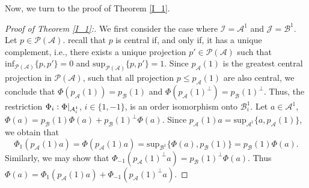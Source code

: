 \documentclass[12pt]{amsart}
\theoremstyle{definition}
\theoremstyle{remark}
\numberwithin{equation}{section}
\begin{document}
Now, we turn to the proof of Theorem \ref{I_1}.
\begin{proof}[Proof of Theorem \ref{I_1}:]
	We first consider  the case where $\mathcal{I}=\mathcal{A}^1$ and 	$\mathcal{J}=\mathcal{B}^1$.  Let  $p\in\mathcal{P(A)}$.   recall that  $p$ is central if, and only if, it has a unique complement, i.e., there exists a unique projection  $p'\in\mathcal{P(A)}$ such that $\mathrm{inf}_{\mathcal{P(A)}}\{p,p'\}=0$ and $\mathrm{sup}_{\mathcal{P(A)}}\{p,p'\}=1$. Since $p_{\mathcal{A}}(1)$ is the greatest central  projection in  $\mathcal{P(A)}$, such that all projection $p\leq p_{\mathcal{A}}(1)$ are  also central, we conclude that  $\Phi\left( p_\mathcal{A} (1)\right) =p_\mathcal{B} (1)$ and $\Phi\left( p_\mathcal{A} (1)^\perp\right)= p_\mathcal{B} (1)^\perp$. Thus, the restriction $\Phi_i:\Phi\arrowvert_{\mathcal{A}_i^1}$,  $i\in\{1,-1\}$,   is an order isomorphism onto   $\mathcal{B}_i^1$. Let $a\in\mathcal{A}^1$, $\Phi(a)=p_\mathcal{B} (1)\Phi(a)+p_\mathcal{B} (1)^\perp\Phi(a)$. Since $p_\mathcal{A} (1)a=\mathrm{sup}_{\mathcal{A}^{1}}\{a,p_\mathcal{A} (1)\}$, we obtain that $$\Phi_1\left( p_\mathcal{A} (1)a\right)  =\Phi\left( p_\mathcal{A} (1)a\right)=\mathrm{sup}_{\mathcal{B}^1}\{\Phi(a),p_\mathcal{B} (1)\}=p_\mathcal{B} (1)\Phi(a).$$ 
	Similarly, we may show that $\Phi_{-1}\left( p_\mathcal{A} (1)^\perp a\right)=p_\mathcal{B} (1)^\perp\Phi(a)$. Thus $\Phi(a)=\Phi_{1}(p_\mathcal{A} (1)a)+\Phi_{-1}(p_\mathcal{A} (1)^{\perp}a)$. 
	

\end{proof}
\end{document}
